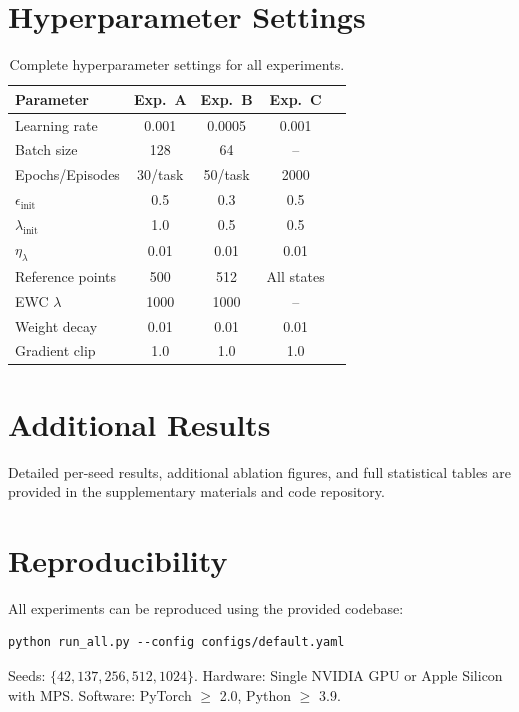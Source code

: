 \documentclass{article}
\begin{document}
\section{Hyperparameter Settings}
\label{app:hyperparams}

\begin{table}[h]
\centering
\caption{Complete hyperparameter settings for all experiments.}
\begin{tabular}{lcccc}
\toprule
Parameter & Exp.\ A & Exp.\ B & Exp.\ C \\
\midrule
Learning rate & 0.001 & 0.0005 & 0.001 \\
Batch size & 128 & 64 & -- \\
Epochs/Episodes & 30/task & 50/task & 2000 \\
$\epsilon_{\text{init}}$ & 0.5 & 0.3 & 0.5 \\
$\lambda_{\text{init}}$ & 1.0 & 0.5 & 0.5 \\
$\eta_\lambda$ & 0.01 & 0.01 & 0.01 \\
Reference points & 500 & 512 & All states \\
EWC $\lambda$ & 1000 & 1000 & -- \\
Weight decay & 0.01 & 0.01 & 0.01 \\
Gradient clip & 1.0 & 1.0 & 1.0 \\
\bottomrule
\end{tabular}
\end{table}

\section{Additional Results}
\label{app:additional_results}

Detailed per-seed results, additional ablation figures, and full statistical tables are provided in the supplementary materials and code repository.

\section{Reproducibility}
\label{app:reproducibility}

All experiments can be reproduced using the provided codebase:
\begin{verbatim}
python run_all.py --config configs/default.yaml
\end{verbatim}
Seeds: $\{42, 137, 256, 512, 1024\}$. Hardware: Single NVIDIA GPU or Apple Silicon with MPS. Software: PyTorch $\geq$ 2.0, Python $\geq$ 3.9.
\end{document}
